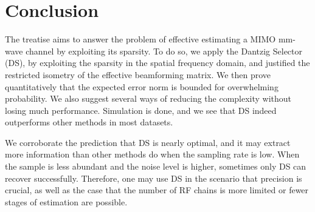 
\chapter {Conclusion}

The treatise aims to answer the problem of effective estimating a MIMO mm-wave channel by exploiting its sparsity.
To do so, we apply the Dantzig Selector (DS), by exploiting the sparsity in the spatial frequency domain, and justified the restricted isometry of the effective beamforming matrix.
We then prove quantitatively that the expected error norm is bounded for overwhelming probability.
We also suggest several ways of reducing the complexity without losing much performance.
Simulation is done, and we see that DS indeed outperforms other methods in most datasets.

We corroborate the prediction that DS is nearly optimal, and it may extract more information than other methods do when the sampling rate is low.
When the sample is less abundant and the noise level is higher, sometimes only DS can recover successfully.
Therefore, one may use DS in the scenario that precision is crucial, as well as the case that the number of RF chains is more limited or fewer stages of estimation are possible.

